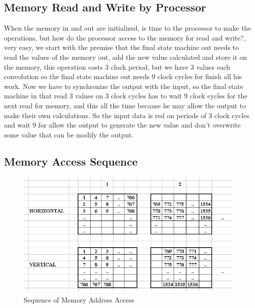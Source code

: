 \documentclass[11pt,a4paper]{article}
\begin{document}
\subsection{Memory Read and Write by Processor}
\label{sec:memreadwrite}
When the memory in and out are initialized, is time to the processor to make the operations, but how do the processor access to the memory for read and write?, very easy, we start with the premise that the final state machine out needs to read the values of the memory out, add the new value calculated and store it on the memory, this operation costs 3 clock period, but we have 3 values each convolution so the final state machine out needs 9 clock cycles for finish all his work. Now we have to synchronize the output with the input, so the final state machine in that read 3 values on 3 clock cycles has to wait 9 clock cycles for the next read for memory, and this all the time because he may allow the output to make their own calculations. So the input data is red on periods of 3 clock cycles and wait 9 for allow the output to generate the new value and don't overwrite some value that can be modify the output.

\subsection{Memory Access Sequence}
\label{sec:memoryaccess}
\begin{figure}[h]
	\centering
		\includegraphics[width=5in]{./images/memoryAccess.PNG}
	\caption{Sequence of Memory Address Access}	
	\label{fig:memaccess}
\end{figure}
\end{document}
